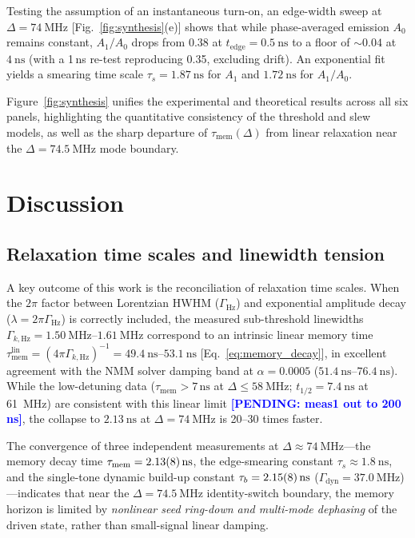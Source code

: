 \documentclass[aps,prb,reprint,superscriptaddress,floatfix]{revtex4-2}
\newcommand{\pend}[1]{\textcolor{blue}{\textbf{[PENDING: #1]}}}
\newcommand{\pend}[1]{}
\begin{document}
Testing the assumption of an instantaneous turn-on, an edge-width sweep at $\Delta=\SI{74}{\mega\hertz}$ [Fig.~\ref{fig:synthesis}(e)] shows that while phase-averaged emission $A_0$ remains constant, $A_1/A_0$ drops from 0.38 at $t_{\mathrm{edge}}=\SI{0.5}{\nano\second}$ to a floor of $\sim 0.04$ at $\SI{4}{\nano\second}$ (with a 1\,ns re-test reproducing 0.35, excluding drift). An exponential fit yields a smearing time scale $\tau_s=\SI{1.87}{\nano\second}$ for $A_1$ and $\SI{1.72}{\nano\second}$ for $A_1/A_0$.

Figure~\ref{fig:synthesis} unifies the experimental and theoretical results across all six panels, highlighting the quantitative consistency of the threshold and slew models, as well as the sharp departure of $\tau_{\mathrm{mem}}(\Delta)$ from linear relaxation near the $\Delta=\SI{74.5}{\mega\hertz}$ mode boundary.

\section{Discussion}\label{sec:disc}

\subsection{Relaxation time scales and linewidth tension}\label{sec:disc_tension}

A key outcome of this work is the reconciliation of relaxation time scales. When the $2\pi$ factor between Lorentzian HWHM ($\Gamma_{\mathrm{Hz}}$) and exponential amplitude decay ($\lambda=2\pi\Gamma_{\mathrm{Hz}}$) is correctly included, the measured sub-threshold linewidths $\Gamma_{k,\mathrm{Hz}}=\SIrange{1.50}{1.61}{\mega\hertz}$ correspond to an intrinsic linear memory time $\tau_{\mathrm{mem}}^{\mathrm{lin}}=(4\pi\Gamma_{k,\mathrm{Hz}})^{-1}=\SIrange{49.4}{53.1}{\nano\second}$ [Eq.~\eqref{eq:memory_decay}], in excellent agreement with the NMM solver damping band at $\alpha=0.0005$ ($\SIrange{51.4}{76.4}{\nano\second}$). While the low-detuning data ($\tau_{\mathrm{mem}}>7\,\text{ns}$ at $\Delta\le\SI{58}{\mega\hertz}$; $t_{1/2}=\SI{7.4}{\nano\second}$ at \SI{61}{\mega\hertz}) are consistent with this linear limit \pend{meas1 out to 200 ns}, the collapse to $\SI{2.13}{\nano\second}$ at $\Delta=\SI{74}{\mega\hertz}$ is 20--30 times faster.

The convergence of three independent measurements at $\Delta\approx\SI{74}{\mega\hertz}$---the memory decay time $\tau_{\mathrm{mem}}=\SI{2.13 \pm 0.08}{\nano\second}$, the edge-smearing constant $\tau_s\approx\SI{1.8}{\nano\second}$, and the single-tone dynamic build-up constant $\tau_b=\SI{2.15 \pm 0.08}{\nano\second}$ ($\Gamma_{\mathrm{dyn}}=\SI{37.0}{\mega\hertz}$)---indicates that near the $\Delta=\SI{74.5}{\mega\hertz}$ identity-switch boundary, the memory horizon is limited by \emph{nonlinear seed ring-down and multi-mode dephasing} of the driven state, rather than small-signal linear damping.
\end{document}
